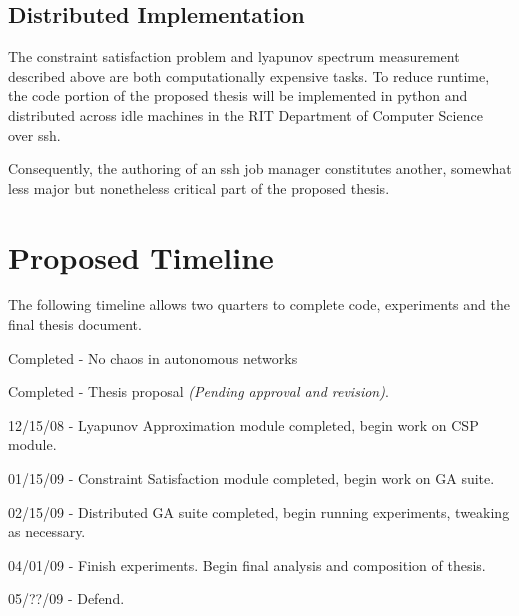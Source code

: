 \documentclass[12pt]{article}
\begin{document}
\subsection{Distributed Implementation}
The constraint satisfaction problem and lyapunov spectrum measurement described
above are both computationally expensive tasks.  To reduce runtime, the code
portion of the proposed thesis will be implemented in python and distributed
across idle machines in the RIT Department of Computer Science over ssh.

Consequently, the authoring of an ssh job manager constitutes another, somewhat
less major but nonetheless critical part of the proposed thesis.
\newpage
\section{Proposed Timeline}
The following timeline allows two quarters to complete code, experiments and the final thesis document.

Completed - No chaos in autonomous networks

Completed - Thesis proposal \textit{(Pending approval and revision)}.

12/15/08 - Lyapunov Approximation module completed, begin work on CSP module.

01/15/09 - Constraint Satisfaction module completed, begin work on GA suite.

02/15/09 - Distributed GA suite completed, begin running experiments, tweaking as necessary.

04/01/09 - Finish experiments.  Begin final analysis and composition of thesis.

05/??/09 - Defend.
\end{document}
